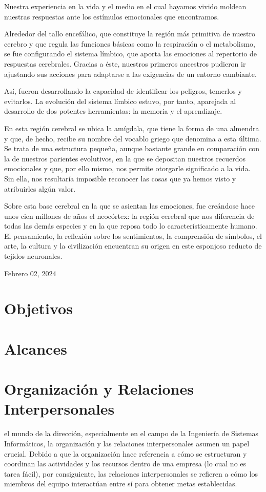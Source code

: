 \documentclass[journal]{IEEEtran}
\begin{document}
Nuestra experiencia en la vida y el medio en el cual hayamos vivido moldean nuestras respuestas ante los estímulos emocionales que encontramos.

Alrededor del tallo encefálico, que constituye la región más primitiva de nuestro cerebro y que regula las funciones básicas como la respiración o el metabolismo, se fue configurando el sistema límbico, que aporta las emociones al repertorio de respuestas cerebrales. Gracias a éste, nuestros primeros ancestros pudieron ir ajustando sus acciones para adaptarse a las exigencias de un entorno cambiante.

Así, fueron desarrollando la capacidad de identificar los peligros, temerlos y evitarlos. La evolución del sistema límbico estuvo, por tanto, aparejada al desarrollo de dos potentes herramientas: la memoria y el aprendizaje.

En esta región cerebral se ubica la amígdala, que tiene la forma de una almendra y que, de hecho, recibe su nombre del vocablo griego que denomina a esta última. Se trata de una estructura pequeña, aunque bastante grande en comparación con la de nuestros parientes evolutivos, en la que se depositan nuestros recuerdos emocionales y que, por ello mismo, nos permite otorgarle significado a la vida. Sin ella, nos resultaría imposible reconocer las cosas que ya hemos visto y atribuirles algún valor.

Sobre esta base cerebral en la que se asientan las emociones, fue creándose hace unos cien millones de años el neocórtex: la región cerebral que nos diferencia de todas las demás especies y en la que reposa todo lo característicamente humano. El pensamiento, la reflexión sobre los sentimientos, la comprensión de símbolos, el arte, la cultura y la civilización encuentran su origen en este esponjoso reducto de tejidos neuronales.

\hfill Febrero 02, 2024

\section{Objetivos}

\section{Alcances}

\section{Organización y Relaciones Interpersonales}
 el mundo de la dirección, especialmente en el campo de la Ingeniería de Sistemas Informáticos, la organización y las relaciones interpersonales asumen un papel crucial. Debido a que la organización hace referencia a cómo se estructuran y coordinan las actividades y los recursos dentro de una empresa (lo cual no es tarea fácil), por consiguiente, las relaciones interpersonales se refieren a cómo los miembros del equipo interactúan entre sí para obtener metas establecidas.
\end{document}

